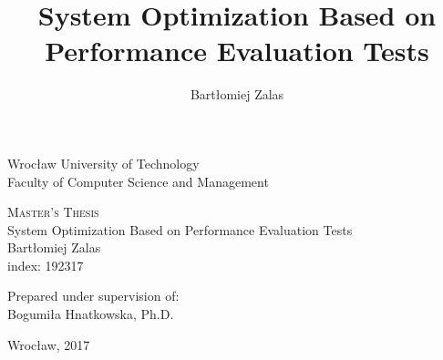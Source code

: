 \documentclass[12pt,a4paper]{article}
\author{Bartłomiej Zalas}
\title{System Optimization Based on Performance Evaluation Tests}
\begin{document}
\begin{titlepage}
\begin{center}


\LARGE Wrocław University of Technology\\
\large Faculty of Computer Science and Management\\[7cm]

\begin{center}
\textsc{\huge Master's Thesis}\\
\LARGE System Optimization Based on Performance Evaluation Tests \\[1.0cm]
\large Bartłomiej Zalas\\index: 192317\\[3cm]
\end{center}

\begin{flushright} 
\large Prepared under supervision of:\\Bogumiła Hnatkowska, Ph.D.
\end{flushright}


\vfill

{\large Wrocław, 2017}

\end{center}
\end{titlepage}


\pagebreak
        
\tableofcontents

\pagebreak
\end{document}
